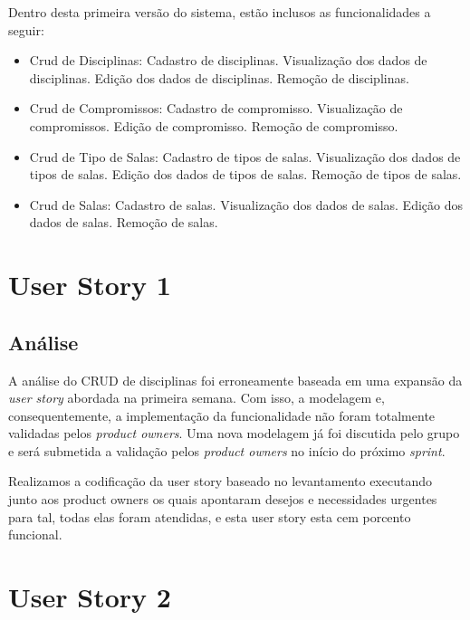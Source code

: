 \documentclass{abnt}
\begin{document}
		Dentro desta primeira versão do sistema, estão inclusos as funcionalidades a seguir:
			\begin{itemize}
			\item Crud de Disciplinas:
			\subitem Cadastro de disciplinas.
			\subitem Visualização dos dados de disciplinas.
			\subitem Edição dos dados de disciplinas.
			\subitem Remoção de disciplinas.
			
			\item Crud de Compromissos:
			\subitem Cadastro de compromisso.
			\subitem Visualização de compromissos.
			\subitem Edição de compromisso.
			\subitem Remoção de compromisso.
			
			\item Crud de Tipo de Salas:
			\subitem Cadastro de tipos de salas.
			\subitem Visualização dos dados de tipos de salas.
			\subitem Edição dos dados de tipos de salas.
			\subitem Remoção de tipos de salas.
			
			\item Crud de Salas:
			\subitem Cadastro de salas.
			\subitem Visualização dos dados de salas.
			\subitem Edição dos dados de salas.
			\subitem Remoção de salas.

			\end{itemize}

	
	\section{User Story 1}
	\subsection{Análise}
		A análise do CRUD de disciplinas foi erroneamente baseada em uma expansão da \emph{user story} abordada na primeira semana. Com isso, a modelagem e, consequentemente, a implementação da funcionalidade não foram totalmente validadas pelos \emph{product owners}.
		Uma nova modelagem já foi discutida pelo grupo e será submetida a validação pelos \emph{product owners} no início do próximo \emph{sprint}.
		
		Realizamos a codificação da user story baseado no levantamento executando junto aos product owners os quais apontaram desejos e necessidades urgentes para tal, todas elas foram atendidas, e esta user story esta cem porcento funcional. 
	
	\section{User Story 2}
\end{document}
